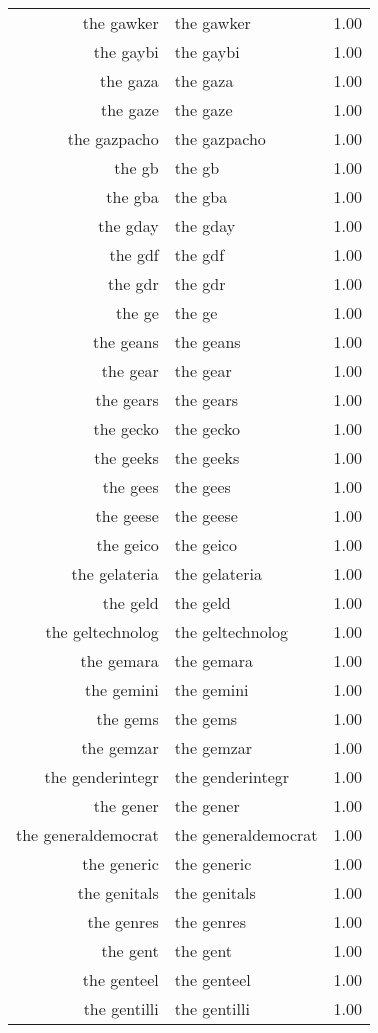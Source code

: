\begin{table}[ht]
\begin{tabular}{rlr}
  the gawker & the gawker & 1.00 \\ 
  the gaybi & the gaybi & 1.00 \\ 
  the gaza & the gaza & 1.00 \\ 
  the gaze & the gaze & 1.00 \\ 
  the gazpacho & the gazpacho & 1.00 \\ 
  the gb & the gb & 1.00 \\ 
  the gba & the gba & 1.00 \\ 
  the gday & the gday & 1.00 \\ 
  the gdf & the gdf & 1.00 \\ 
  the gdr & the gdr & 1.00 \\ 
  the ge & the ge & 1.00 \\ 
  the geans & the geans & 1.00 \\ 
  the gear & the gear & 1.00 \\ 
  the gears & the gears & 1.00 \\ 
  the gecko & the gecko & 1.00 \\ 
  the geeks & the geeks & 1.00 \\ 
  the gees & the gees & 1.00 \\ 
  the geese & the geese & 1.00 \\ 
  the geico & the geico & 1.00 \\ 
  the gelateria & the gelateria & 1.00 \\ 
  the geld & the geld & 1.00 \\ 
  the geltechnolog & the geltechnolog & 1.00 \\ 
  the gemara & the gemara & 1.00 \\ 
  the gemini & the gemini & 1.00 \\ 
  the gems & the gems & 1.00 \\ 
  the gemzar & the gemzar & 1.00 \\ 
  the genderintegr & the genderintegr & 1.00 \\ 
  the gener & the gener & 1.00 \\ 
  the generaldemocrat & the generaldemocrat & 1.00 \\ 
  the generic & the generic & 1.00 \\ 
  the genitals & the genitals & 1.00 \\ 
  the genres & the genres & 1.00 \\ 
  the gent & the gent & 1.00 \\ 
  the genteel & the genteel & 1.00 \\ 
  the gentilli & the gentilli & 1.00 \\ 

\end{tabular}
\end{table}
